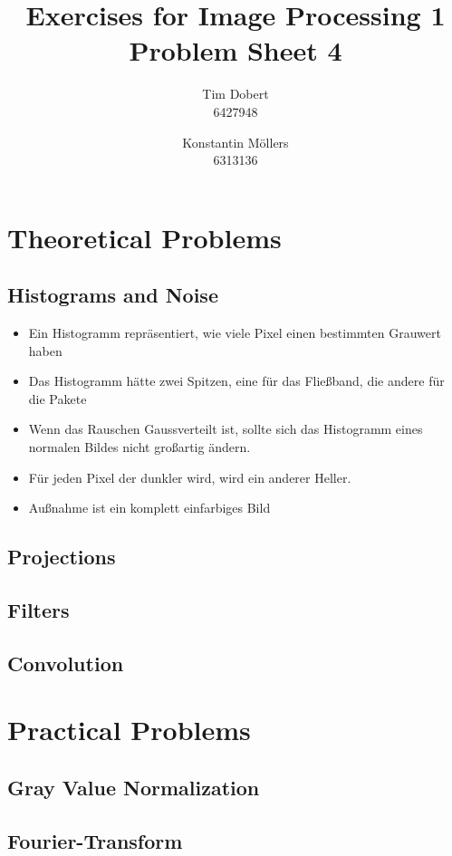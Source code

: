 \documentclass[a4paper,12pt]{article}
\title{\textbf{Exercises for Image Processing 1}\\Problem Sheet 4}
\author{Tim Dobert\\6427948 \and Konstantin M\"ollers\\6313136}
\begin{document}
	\maketitle	
	
	\section{Theoretical Problems}
	\subsection{Histograms and Noise}
	
	\begin{itemize}
		\item Ein Histogramm repräsentiert, wie viele Pixel einen bestimmten Grauwert haben
		\item Das Histogramm hätte zwei Spitzen, eine für das Fließband, die andere für die Pakete
		\item Wenn das Rauschen Gaussverteilt ist, sollte sich das Histogramm eines normalen Bildes nicht großartig ändern.
		\item Für jeden Pixel der dunkler wird, wird ein anderer Heller.
		\item Außnahme ist ein komplett einfarbiges Bild
	\end{itemize}
	
	\subsection{Projections}
	\subsection{Filters}
	\subsection{Convolution}
	
	\section{Practical Problems}
	\subsection{Gray Value Normalization}
	\subsection{Fourier-Transform}
	
\end{document}
